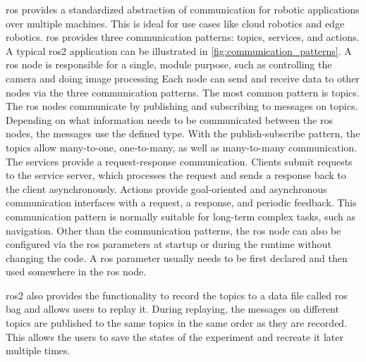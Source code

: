 \gls{ros} provides a standardized abstraction of communication for robotic applications over multiple machines. This is ideal for use cases like cloud robotics and edge robotics. \gls{ros} provides three communication patterns: topics, services, and actions. A typical \gls{ros}2 application can be illustrated in \cref{fig:communication_patterns}. A \gls{ros} node is responsible for a single, module purpose, such as controlling the camera and doing image processing \cite{ROSGalactic2021} Each node can send and receive data to other nodes via the three communication patterns. The most common pattern is topics. The \gls{ros} nodes communicate by publishing and subscribing to messages on topics. Depending on what information needs to be communicated between the \gls{ros} nodes, the messages use the defined type. With the publish-subscribe pattern, the topics allow many-to-one, one-to-many, as well as many-to-many communication. The services provide a request-response communication. Clients submit requests to the service server, which processes the request and sends a response back to the client asynchronously. Actions provide goal-oriented and asynchronous communication interfaces with a request, a response, and periodic feedback. This communication pattern is normally suitable for long-term complex tasks, such as navigation. Other than the communication patterns, the \gls{ros} node can also be configured via the \gls{ros} parameters at startup or during the runtime without changing the code. A \gls{ros} parameter usually needs to be first declared and then used somewhere in the \gls{ros} node. 

\gls{ros}2 also provides the functionality to record the topics to a data file called \gls{ros} bag and allows users to replay it. During replaying, the messages on different topics are published to the same topics in the same order as they are recorded. This allows the users to save the states of the experiment and recreate it later multiple times. 

